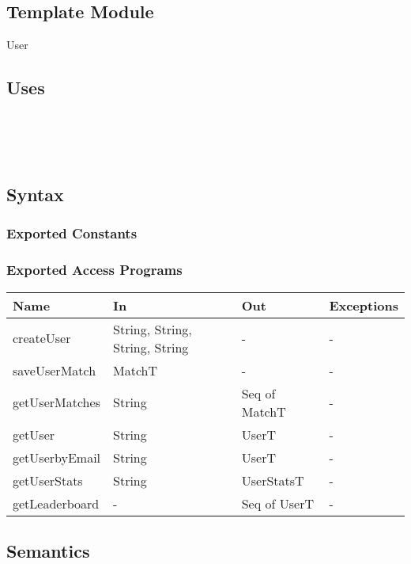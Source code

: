 \documentclass[12pt, titlepage]{article}
\begin{document}
\subsection{Template Module}

User

\subsection{Uses}

 \\
 \\
 \\

\subsection{Syntax}

\subsubsection{Exported Constants}

\subsubsection{Exported Access Programs}

\begin{center}
\begin{tabular}{|p{4cm}| p{4cm}| p{4cm} | p{3cm}|}
\hline
\textbf{Name} & \textbf{In} & \textbf{Out} & \textbf{Exceptions} \\
\hline
createUser & String, String, String, String & - & - \\
saveUserMatch & MatchT &- &- \\
getUserMatches & String & Seq of MatchT & -\\
getUser & String & UserT & -\\
getUserbyEmail & String & UserT & -\\
getUserStats & String & UserStatsT & -\\
getLeaderboard & - & Seq of UserT & -\\

\hline
\end{tabular}
\end{center}

\subsection{Semantics}
\end{document}

